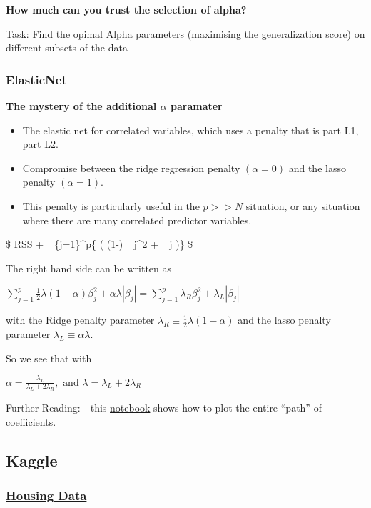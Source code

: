 \documentclass[
  letterpaper,
  DIV=11,
  numbers=noendperiod]{scrreprt}
\providecommand{\tightlist}{%
  \setlength{\itemsep}{0pt}\setlength{\parskip}{0pt}}\usepackage{longtable,booktabs,array}
\begin{document}
\textbf{How much can you trust the selection of alpha?}

Task: Find the opimal Alpha parameters (maximising the generalization
score) on different subsets of the data

\hypertarget{elasticnet}{%
\subsubsection{ElasticNet}\label{elasticnet}}

\textbf{The mystery of the additional \(\alpha\) paramater}

\begin{itemize}
\tightlist
\item
  The elastic net for correlated variables, which uses a penalty that is
  part L1, part L2.
\item
  Compromise between the ridge regression penalty \((\alpha = 0)\) and
  the lasso penalty \((\alpha = 1)\).
\item
  This penalty is particularly useful in the \(p >> N\) situation, or
  any situation where there are many correlated predictor variables.
\end{itemize}

\$ RSS + \lambda \sum\_\{j=1\}\^{}p\{ \left(  (1-\alpha)
\beta\_j\^{}2 + \alpha \textbar{} \beta\_j \textbar{} \right)\} \$

The right hand side can be written as

\(\sum_{j=1}^p{ \frac{1}{2} \lambda (1-\alpha) \beta_j^2 + \alpha \lambda | \beta_j |} = \sum_{j=1}^p{ \lambda_R \beta_j^2 + \lambda_L | \beta_j |}\)

with the Ridge penalty parameter
\(\lambda_R \equiv \frac{1}{2} \lambda (1-\alpha)\) and the lasso
penalty parameter \(\lambda_L \equiv \alpha \lambda\).

So we see that with

\(\alpha = \frac{\lambda_L}{\lambda_L+ 2 \lambda_R}, \text{ and } \lambda= \lambda_L+ 2 \lambda_R\)

Further Reading: - this
\href{plot_lasso_coordinate_descent_path.ipynb}{notebook} shows how to
plot the entire ``path'' of coefficients.

\hypertarget{kaggle}{%
\subsection{Kaggle}\label{kaggle}}

\hypertarget{housing-data}{%
\subsubsection{\texorpdfstring{\href{https://www.kaggle.com/c/house-prices-advanced-regression-techniques}{Housing
Data}}{Housing Data}}\label{housing-data}}
\end{document}
